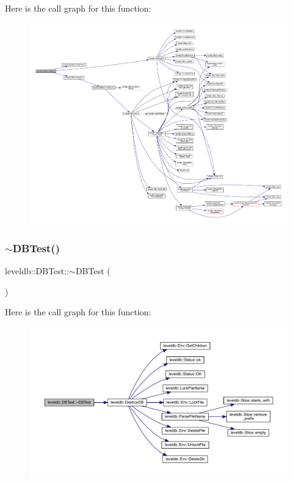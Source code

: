 Here is the call graph for this function\+:
\nopagebreak
\begin{figure}[H]
\begin{center}
\leavevmode
\includegraphics[width=350pt]{classleveldb_1_1_d_b_test_afc6fc9512e900de6ee10c5db15b22930_cgraph}
\end{center}
\end{figure}
\mbox{\label{classleveldb_1_1_d_b_test_a2268045d59c3a74bba03877819e36b55}} 
\subsubsection{\texorpdfstring{$\sim$DBTest()}{~DBTest()}}
{\footnotesize\ttfamily leveldb\+::\+D\+B\+Test\+::$\sim$\+D\+B\+Test (\begin{DoxyParamCaption}{ }\end{DoxyParamCaption})\hspace{0.3cm}{\ttfamily [inline]}}

Here is the call graph for this function\+:
\nopagebreak
\begin{figure}[H]
\begin{center}
\leavevmode
\includegraphics[width=350pt]{classleveldb_1_1_d_b_test_a2268045d59c3a74bba03877819e36b55_cgraph}
\end{center}
\end{figure}


